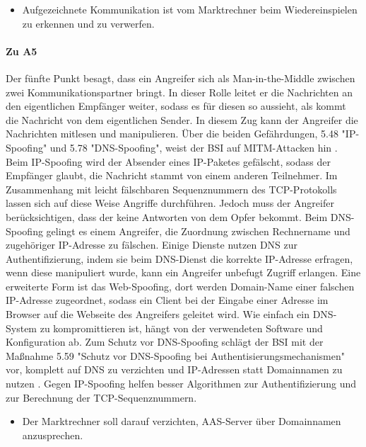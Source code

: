 \documentclass[11pt,a4paper]{report}
\begin{document}
\begin{itemize}[leftmargin=*]
\item Aufgezeichnete Kommunikation ist vom Marktrechner beim Wiedereinspielen zu erkennen und zu verwerfen.
\end{itemize}

\paragraph{Zu A5} Der fünfte Punkt besagt, dass ein Angreifer sich als Man-in-the-Middle zwischen zwei Kommunikationspartner bringt. In dieser Rolle leitet er die Nachrichten an den eigentlichen Empfänger weiter, sodass es für diesen so aussieht, als kommt die Nachricht von dem eigentlichen Sender. In diesem Zug kann der Angreifer die Nachrichten mitlesen und manipulieren. Über die beiden Gefährdungen, 5.48 "IP-Spoofing" und 5.78 "DNS-Spoofing", weist der BSI auf MITM-Attacken hin \cite{bsi_g5048, bsi_g5078}. Beim IP-Spoofing wird der Absender eines IP-Paketes gefälscht, sodass der Empfänger glaubt, die Nachricht stammt von einem anderen Teilnehmer. Im Zusammenhang mit leicht fälschbaren Sequenznummern des TCP-Protokolls lassen sich auf diese Weise Angriffe durchführen. Jedoch muss der Angreifer berücksichtigen, dass der keine Antworten von dem Opfer bekommt. Beim DNS-Spoofing gelingt es einem Angreifer, die Zuordnung zwischen Rechnername und zugehöriger IP-Adresse zu fälschen. Einige Dienste nutzen DNS zur Authentifizierung, indem sie beim DNS-Dienst die korrekte IP-Adresse erfragen, wenn diese manipuliert wurde, kann ein Angreifer unbefugt Zugriff erlangen. Eine erweiterte Form ist das Web-Spoofing, dort werden Domain-Name einer falschen IP-Adresse zugeordnet, sodass ein Client bei der Eingabe einer Adresse im Browser auf die Webseite des Angreifers geleitet wird. Wie einfach ein DNS-System zu kompromittieren ist, hängt von der verwendeten Software und Konfiguration ab. Zum Schutz vor DNS-Spoofing schlägt der BSI mit der Maßnahme 5.59 "Schutz vor DNS-Spoofing bei Authentisierungsmechanismen" vor, komplett auf DNS zu verzichten und IP-Adressen statt Domainnamen zu nutzen \cite{bsi_m5059}. Gegen IP-Spoofing helfen besser Algorithmen zur Authentifizierung und zur Berechnung der TCP-Sequenznummern.

\begin{itemize}[leftmargin=*]
\item Der Marktrechner soll darauf verzichten, AAS-Server über Domainnamen anzusprechen.
\end{itemize}
\end{document}
